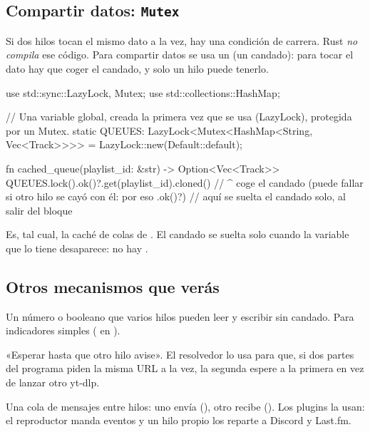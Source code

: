 \subsection{Compartir datos: \texttt{Mutex}}

Si dos hilos tocan el mismo dato a la vez, hay una condición de carrera. Rust \emph{no compila}
ese código. Para compartir datos se usa un  (un candado): para tocar el dato hay que
coger el candado, y solo un hilo puede tenerlo.

\begin{rust}
use std::sync::{LazyLock, Mutex};
use std::collections::HashMap;

// Una variable global, creada la primera vez que se usa (LazyLock), protegida por un Mutex.
static QUEUES: LazyLock<Mutex<HashMap<String, Vec<Track>>>> = LazyLock::new(Default::default);

fn cached_queue(playlist_id: &str) -> Option<Vec<Track>> {
    QUEUES.lock().ok()?.get(playlist_id).cloned()
    //     ^ coge el candado (puede fallar si otro hilo se cayó con él: por eso .ok()?)
}   // aquí se suelta el candado solo, al salir del bloque
\end{rust}

Es, tal cual, la caché de colas de . El candado se suelta solo cuando la
variable que lo tiene desaparece: no hay .

\subsection{Otros mecanismos que verás}

\begin{description}[leftmargin=1.2em]
  \item[\cod{AtomicBool}, \cod{AtomicU64}] Un número o booleano que varios hilos pueden leer y
  escribir sin candado. Para indicadores simples ( en ).
  \item[\cod{Condvar}] «Esperar hasta que otro hilo avise». El resolvedor lo usa para que, si
  dos partes del programa piden la misma URL a la vez, la segunda espere a la primera en vez de
  lanzar otro yt-dlp.
  \item[\cod{mpsc::channel}] Una cola de mensajes entre hilos: uno envía (), otro
  recibe (). Los plugins la usan: el reproductor manda eventos y un hilo propio
  los reparte a Discord y Last.fm.
\end{description}

